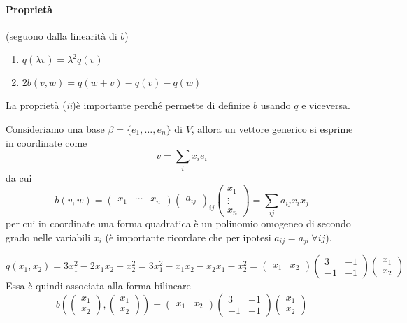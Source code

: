 \documentclass{article}     %
\begin{document}
\paragraph*{Proprietà} (seguono dalla linearità di $b$)
\begin{enumerate}[label=$\roman*)$]
    \item $q(\lambda v)=\lambda^2q(v)$
    \item $2b(v,w)=q(w+v)-q(v)-q(w)$
\end{enumerate}
La proprietà (\textit{ii})è importante perché permette di definire $b$ usando $q$ e viceversa.

\begin{oss}
    Consideriamo una base $\beta=\{e_1,\dots, e_n\}$ di $V$, allora un vettore generico si esprime in coordinate come 
    \[v=\sum_ix_ie_i\]
    da cui 
    \[b(v,w)= \begin{pmatrix}
        x_1&\cdots&x_n
    \end{pmatrix} \begin{pmatrix}
        a_{ij}
    \end{pmatrix}_{ij}\begin{pmatrix}
        x_1\\\vdots\\x_n
    \end{pmatrix}=\sum_{ij}a_{ij}x_ix_j\]
    per cui in coordinate una forma quadratica è un polinomio omogeneo di secondo grado nelle variabili $x_i$ (è importante ricordare che per ipotesi $a_{ij}=a_{ji}\ \forall ij$).
\end{oss}

\begin{ex}
    \[q(x_1,x_2)=3x_1^2-2x_1x_2-x_2^2=3x_1^2-x_1x_2-x_2x_1-x_2^2= \begin{pmatrix}
        x_1&x_2
    \end{pmatrix} \begin{pmatrix}
        3&-1\\-1&-1
    \end{pmatrix} \begin{pmatrix}
        x_1\\x_2
    \end{pmatrix} \]
    Essa è quindi associata alla forma bilineare 
    \[b\left( \begin{pmatrix}
        x_1\\x_2
    \end{pmatrix},\begin{pmatrix}
        x_1\\x_2
    \end{pmatrix}\right) = \begin{pmatrix}
        x_1&x_2
    \end{pmatrix} \begin{pmatrix}
        3&-1\\-1&-1
    \end{pmatrix} \begin{pmatrix}
        x_1\\x_2
    \end{pmatrix} \]
\end{ex}
\end{document}
